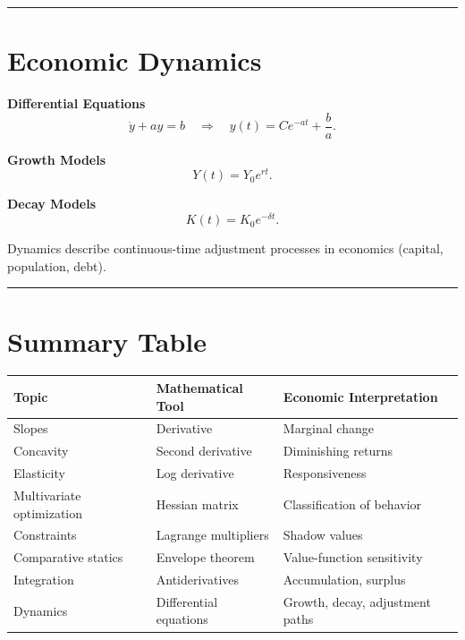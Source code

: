 \documentclass[12pt]{article}
\begin{document}
\hrule
\vspace{10pt}

\section*{Economic Dynamics}

\textbf{Differential Equations}
\[
\dot y + ay = b \quad \Rightarrow\quad y(t)=Ce^{-at}+\frac{b}{a}.
\]

\textbf{Growth Models}
\[
Y(t)=Y_0 e^{rt}.
\]

\textbf{Decay Models}
\[
K(t)=K_0 e^{-\delta t}.
\]

Dynamics describe continuous-time adjustment processes in economics (capital, population, debt).

\hrule
\vspace{10pt}

\section*{Summary Table}

\begin{tabular}{p{3cm} p{4cm} p{4.5cm}}
\textbf{Topic} & \textbf{Mathematical Tool} & \textbf{Economic Interpretation} \\
\hline
Slopes & Derivative & Marginal change \\
Concavity & Second derivative & Diminishing returns \\
Elasticity & Log derivative & Responsiveness \\
Multivariate optimization & Hessian matrix & Classification of behavior \\
Constraints & Lagrange multipliers & Shadow values \\
Comparative statics & Envelope theorem & Value-function sensitivity \\
Integration & Antiderivatives & Accumulation, surplus \\
Dynamics & Differential equations & Growth, decay, adjustment paths \\
\end{tabular}
\end{document}
